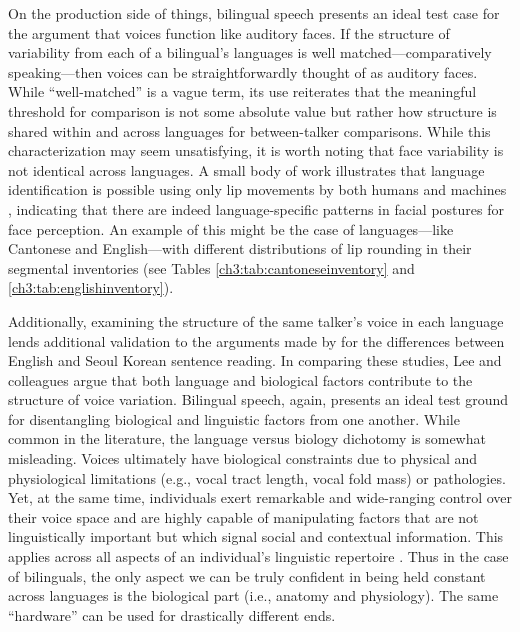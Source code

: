 On the production side of things, bilingual speech presents an ideal test case for the argument that voices function like auditory faces. If the structure of variability from each of a bilingual's languages is well matched---comparatively speaking---then voices can be straightforwardly thought of as auditory faces. While ``well-matched'' is a vague term, its use reiterates that the meaningful threshold for comparison is not some absolute value but rather how structure is shared within and across languages for between-talker comparisons. While this characterization may seem unsatisfying, it is worth noting that face variability is not identical across languages. A small body of work illustrates that language identification is possible using only lip movements by both humans \citep{sotofaraco_2007_discriminating} and machines \citep{afouras_2020_now}, indicating that there are indeed language-specific patterns in facial postures for face perception. An example of this might be the case of languages---like Cantonese and English---with different distributions of lip rounding in their segmental inventories (see Tables \ref{ch3:tab:cantoneseinventory} and \ref{ch3:tab:englishinventory}). 

Additionally, examining the structure of the same talker's voice in each language lends additional validation to the arguments made by \citet{lee_2020_language} for the differences between English and Seoul Korean sentence reading. In comparing these studies, Lee and colleagues argue that both language and biological factors contribute to the structure of voice variation. Bilingual speech, again, presents an ideal test ground for disentangling biological and linguistic factors from one another. While common in the literature, the language versus biology dichotomy is somewhat misleading. Voices ultimately have biological constraints due to physical and physiological limitations (e.g., vocal tract length, vocal fold mass) or pathologies. Yet, at the same time, individuals exert remarkable and wide-ranging control over their voice space and are highly capable of manipulating factors that are not linguistically important but which signal social and contextual information. This applies across all aspects of an individual's linguistic repertoire \citep{bullock_2009_sociophonetics,wei_2018_translanguaging}. Thus in the case of bilinguals, the only aspect we can be truly confident in being held constant across languages is the biological part (i.e., anatomy and physiology). The same ``hardware'' can be used for drastically different ends. 

